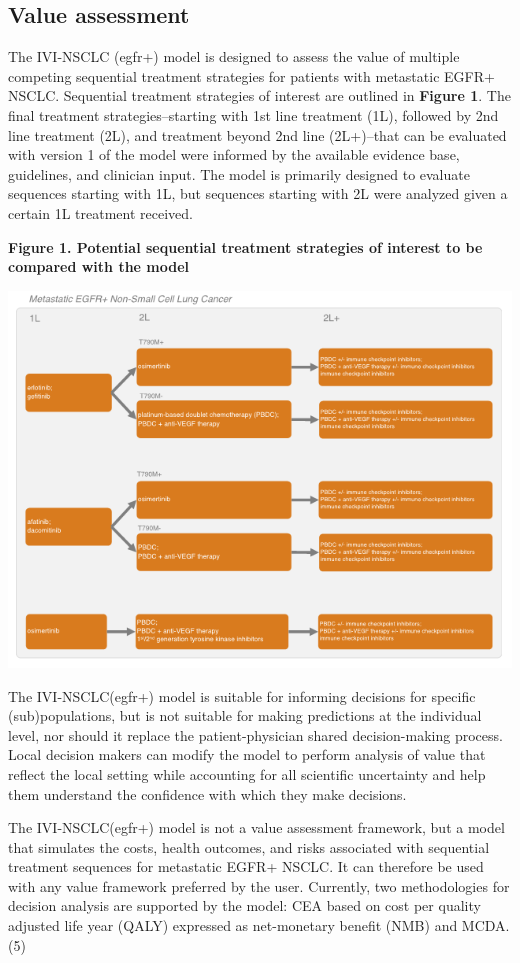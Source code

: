 \documentclass[11pt,final,fleqn]{article}\usepackage[]{graphicx}\usepackage[]{color}
\theoremstyle{plain}
\begin{document}
{\subsection{Value assessment}
The IVI-NSCLC (egfr+) model is designed to assess the value of multiple competing sequential treatment strategies for patients with metastatic EGFR+ NSCLC. Sequential treatment strategies of interest are outlined in \textbf{Figure 1}. The final treatment strategies--starting with 1st line treatment (1L), followed by 2nd line treatment (2L), and treatment beyond 2nd line (2L+)--that can be evaluated with version 1 of the model were informed by the available evidence base, guidelines, and clinician input. The model is primarily designed to evaluate sequences starting with 1L, but sequences starting with 2L were analyzed given a certain 1L treatment received.

\textbf{Figure 1. Potential sequential treatment strategies of interest to be compared with the model} 

\includegraphics[scale=1]{Figure 1.PNG} 


The IVI-NSCLC(egfr+) model is suitable for informing decisions for specific (sub)populations, but is not suitable for making predictions at the individual level, nor should it replace the patient-physician shared decision-making process.  Local decision makers can modify the model to perform analysis of value that reflect the local setting while accounting for all scientific uncertainty and help them understand the confidence with which they make decisions. 
 
The IVI-NSCLC(egfr+) model is not a value assessment framework, but a model that simulates the costs, health outcomes, and risks associated with sequential treatment sequences for metastatic EGFR+ NSCLC. It can therefore be used with any value framework preferred by the user. Currently, two methodologies for decision analysis are supported by the model: CEA based on cost per quality adjusted life year (QALY) expressed as net-monetary benefit (NMB) and MCDA.(5) 

}
\end{document}
